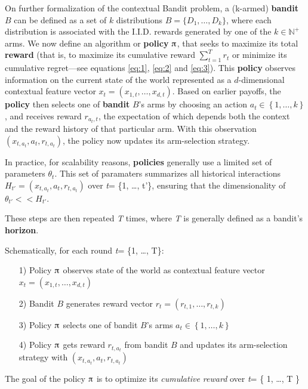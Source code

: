 \documentclass{jss}\usepackage[]{graphicx}\usepackage[]{color}
\begin{document}
On further formalization of the contextual Bandit problem, a (k-armed) \textbf{bandit} $B$ can be defined as a set of $k$ distributions $B=\{D_{1},\dots ,D_{k}\}$, where each distribution is associated with the I.I.D. rewards generated by one of the $k\in \mathbb {N} ^{+}$ arms. We now define an algorithm or \textbf{policy} $\piup$, that seeks to maximize its total \textbf{reward} (that is, to maximize its cumulative reward $\sum_{t=1}^T r_t$ or minimize its cumulative regret---see equations \ref{eq:1}, \ref{eq:2} and \ref{eq:3}). This \textbf{policy} observes information on the current state of the world represented as a $d$-dimensional contextual feature vector \(x_{t}=\left( x_{1,t},  \dots, x_{d,t}\right)\). Based on earlier payoffs, the \textbf{policy} then selects one of \textbf{bandit} $B$'s arms by choosing an action \(a_{t} \in \left\{ 1, \dots, k \right\}\), and receives reward \(r_{a_{t},t}\), the expectation of which depends both the context and the reward history of that particular arm. With this observation \( (x_{t,a_t},a_{t},r_{t,a_t}) \), the policy now updates its arm-selection strategy.

In practice, for scalability reasons, \textbf{policies} generally use a limited set of parameters $\theta_{t}$. This set of paramaters summarizes all historical interactions \( H_{t'} = (x_{t,a_t},a_{t},r_{t,a_t}) \) over \emph{t}= \{1, \ldots, t'\}, ensuring that the dimensionality of $\theta_{t'} << H_{t'}$.

These steps are then repeated \textit{T} times, where \textit{T} is generally defined as a bandit's \textbf{horizon}.

Schematically, for each round \emph{t}= \{1, \ldots, T\}:

\begin{enumerate}
         \item[1)] Policy $\piup$ observes state of the world as contextual feature vector \(x_{t}=\left( x_{1,t},  \dots, x_{d,t}\right)\)
         \item[2)] Bandit $B$ generates reward vector \(r_{t}=\left( r_{t,1},  \dots, r_{t,k}\right)\)
         \item[3)] Policy $\piup$ selects one of bandit $B$'s arms \(a_{t} \in \left\{ 1, \dots, k \right\}\)
         \item[4)] Policy $\piup$ gets reward \(r_{t,a_t}\) from bandit $B$ and updates its arm-selection strategy with \( (x_{t,a_t},a_{t},r_{t,a_t}) \)
\end{enumerate}

The goal of the policy $\piup$ is to optimize its \textit{cumulative reward} over \emph{t}= \{ 1, \ldots, T \}
\end{document}
